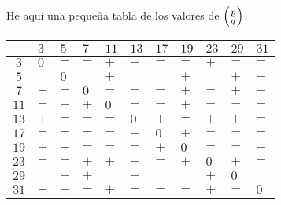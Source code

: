 \documentclass{article}
\theoremstyle{plain}
\begin{document}
He aquí una pequeña tabla de los valores de $\left(\frac{p}{q}\right)$.

\begin{center}
\begin{tabular}{|c|f{0.5cm}|f{0.5cm}|f{0.5cm}|f{0.5cm}|f{0.5cm}|f{0.5cm}|f{0.5cm}|f{0.5cm}|f{0.5cm}|f{0.5cm}|}
\hline
{} & $3$ & $5$ & $7$ & $11$ & $13$ & $17$ & $19$ & $23$ & $29$ & $31$ \tabularnewline
\hline
$3$ & $0$ & $-$ & $-$ & $+$ & $+$ & $-$ & $-$ & $+$ & $-$ & $-$ \tabularnewline
\hline
$5$ & $-$ & $0$ & $-$ & $+$ & $-$ & $-$ & $+$ & $-$ & $+$ & $+$ \tabularnewline
\hline
$7$ & $+$ & $-$ & $0$ & $-$ & $-$ & $-$ & $+$ & $-$ & $+$ & $+$ \tabularnewline
\hline
$11$ & $-$ & $+$ & $+$ & $0$ & $-$ & $-$ & $+$ & $-$ & $-$ & $-$ \tabularnewline
\hline
$13$ & $+$ & $-$ & $-$ & $-$ & $0$ & $+$ & $-$ & $+$ & $+$ & $-$ \tabularnewline
\hline
$17$ & $-$ & $-$ & $-$ & $-$ & $+$ & $0$ & $+$ & $-$ & $-$ & $-$ \tabularnewline
\hline
$19$ & $+$ & $+$ & $-$ & $-$ & $-$ & $+$ & $0$ & $-$ & $-$ & $+$ \tabularnewline
\hline
$23$ & $-$ & $-$ & $+$ & $+$ & $+$ & $-$ & $+$ & $0$ & $+$ & $-$ \tabularnewline
\hline
$29$ & $-$ & $+$ & $+$ & $-$ & $+$ & $-$ & $-$ & $+$ & $0$ & $-$ \tabularnewline
\hline
$31$ & $+$ & $+$ & $-$ & $+$ & $-$ & $-$ & $-$ & $+$ & $-$ & $0$ \tabularnewline
\hline
\end{tabular}
\end{center}
\end{document}
